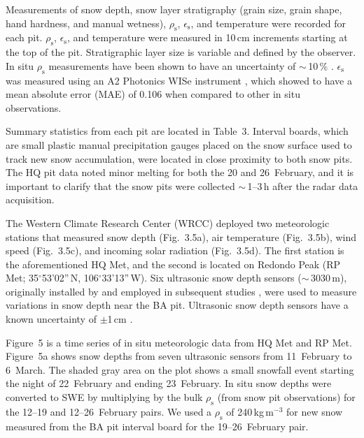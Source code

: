 Measurements of snow depth, snow layer stratigraphy (grain size, grain shape, hand hardness, and manual wetness), $\rho_\mathrm{s}$, $\epsilon_\mathrm{s}$, and temperature were recorded for each pit. $\rho_\mathrm{s}$, $\epsilon_\mathrm{s}$, and temperature were measured in 10\,cm increments starting at the top of the pit. Stratigraphic layer size is variable and defined by the observer. In situ $\rho_\mathrm{s}$ measurements have been shown to have an uncertainty of $\sim$\,10\,\% \citep{congerComparisonDensityCutters2009, prokschIntercomparisonSnowDensity2016}. $\epsilon_\mathrm{s}$ was measured using an A2 Photonics WISe instrument \citep{A2PhotonicWISe2021}, which \citet{webbSituDeterminationDry2021} showed to have a mean absolute error (MAE) of 0.106 when compared to other in situ observations.

Summary statistics from each pit are located in Table~3. Interval boards, which are small plastic manual precipitation gauges placed on the snow surface used to track new snow accumulation, were located in close proximity to both snow pits. The HQ pit data noted minor melting for both the 20 and 26~February, and it is important to clarify that the snow pits were collected $\sim$\,1--3\,h after the radar data acquisition.

The Western Climate Research Center (WRCC) deployed two meteorologic stations that measured snow depth (Fig.~3.5a), air temperature (Fig.~3.5b), wind speed (Fig.~3.5c), and incoming solar radiation (Fig.~3.5d). The first station is the aforementioned HQ Met, and the second is located on Redondo Peak (RP Met; 35$^{\circ}$53'02''\,N, 106$^{\circ}$33'13''\,W). Six ultrasonic snow depth sensors ($\sim$\,3030\,m), originally installed by \citet{molotchEcohydrologicalControlsSnowmelt2009} and employed in subsequent studies \citep{musselmanEffectsVegetationSnow2008,harpoldSoilMoistureResponse2015}, were used to measure variations in snow depth near the BA pit. Ultrasonic snow depth sensors have a known uncertainty of $\pm$1\,cm \citep{ryanEvaluationUltrasonicSnow2008}.

Figure~5 is a time series of in situ meteorologic data from HQ Met and RP Met. Figure~5a shows snow depths from seven ultrasonic sensors from 11~February to 6~March. The shaded gray area on the plot shows a small snowfall event starting the night of 22~February and ending 23~February. In situ snow depths were converted to SWE by multiplying by the bulk $\rho_\mathrm{s}$ (from snow pit observations) for the 12--19 and 12--26~February pairs. We used a $\rho_\mathrm{s}$ of 240\,kg\,m$^{-3}$ for new snow measured from the BA pit interval board for the 19--26~February pair.

